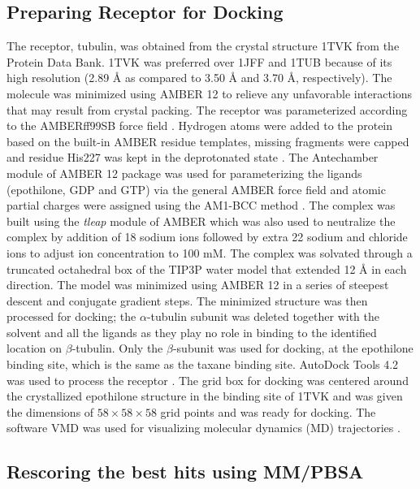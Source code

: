 \documentclass[11pt]{report}
\begin{document}
\subsection{Preparing Receptor for Docking}
\label{ss:VS-Methods_recPrep}

The receptor, tubulin, was obtained from the crystal structure 1TVK from the Protein Data Bank. 1TVK was preferred over 1JFF and 1TUB because of its high resolution (2.89 \r{A} as compared to 3.50 \r{A} and 3.70 \r{A}, respectively). The molecule was minimized using AMBER 12
\cite{case2012}
to relieve any unfavorable interactions that may result from crystal packing. The receptor was parameterized according to the AMBERff99SB force field
\cite{Hornak2006}. 
Hydrogen atoms were added to the protein based on the built-in AMBER residue templates, missing fragments were capped and residue His227 was kept in the deprotonated state
\cite{Nettles2004}. 
The Antechamber module of AMBER 12 package was used for parameterizing the ligands (epothilone, GDP and GTP) via the general AMBER force field
\cite{Wang2004}
and atomic partial charges were assigned using the AM1-BCC method
\cite{Jakalian2002}. 
The complex was built using the \emph{tleap} module of AMBER which was also used to neutralize the complex by addition of 18 sodium ions followed by extra 22 sodium and chloride ions to adjust ion concentration to 100 mM. The complex was solvated through a truncated octahedral box of the TIP3P water model that extended 
12 \r{A} in each direction. The model was minimized using AMBER 12 in a series of steepest descent and conjugate gradient steps. The minimized structure was then processed for docking; the $\alpha$-tubulin subunit
was deleted together with the solvent and all the ligands as they play no role in binding to the identified location on $\beta$-tubulin. Only the $\beta$-subunit was used for docking, at the epothilone binding site, which is the same as the taxane binding site. AutoDock Tools 4.2 was used to process the receptor
\cite{Morris2009}. 
The grid box for docking was centered around the crystallized epothilone structure in the binding site of 1TVK and was given the dimensions of $58 \times 58 \times 58$ grid points and was ready for docking. The software VMD was used for visualizing molecular dynamics (MD) trajectories
\cite{Humphrey1996}.

\subsection{Rescoring the best hits using MM/PBSA}
\label{ss:VS-Methods_rescoring}
\end{document}
